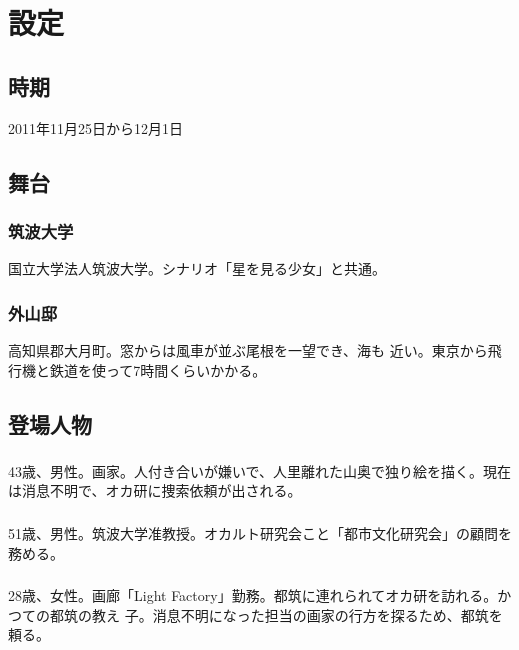 \documentclass[a4paper,8pt,min]{jsarticle}
\begin{document}

 \section{設定}
\subsection{時期}
2011年11月25日から12月1日

\subsection{舞台}
\subsubsection{筑波大学}
国立大学法人筑波大学。シナリオ「星を見る少女」と共通。

\subsubsection{外山邸}
高知県郡大月町。窓からは風車が並ぶ尾根を一望でき、海も
近い。東京から飛行機と鉄道を使って7時間くらいかかる。

\subsection{登場人物}
\subsubsection{}
43歳、男性。画家。人付き合いが嫌いで、人里離れた山奥で独り絵を描く。現在
は消息不明で、オカ研に捜索依頼が出される。

\subsubsection{} 
51歳、男性。筑波大学准教授。オカルト研究会こと「都市文化研究会」の顧問を務める。

\subsubsection{}
28歳、女性。画廊「Light Factory」勤務。都筑に連れられてオカ研を訪れる。かつての都筑の教え
子。消息不明になった担当の画家の行方を探るため、都筑を頼る。
\end{document}
